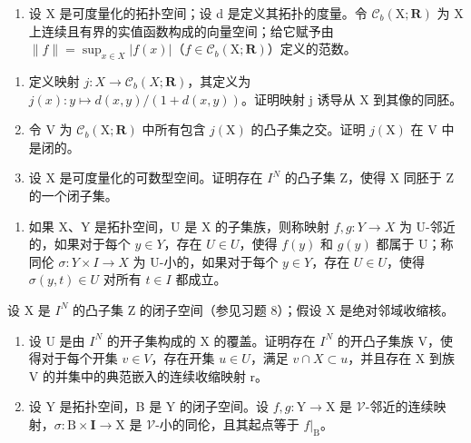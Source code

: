 \begin{enumerate}
\def\labelenumi{\arabic{enumi})}
\setcounter{enumi}{7}
\tightlist
\item
  设 X 是可度量化的拓扑空间；设 d 是定义其拓扑的度量。令 \(\mathcal{C}_{b}(\mathrm{X};\mathbf{R})\) 为 X 上连续且有界的实值函数构成的向量空间；给它赋予由 \(\|f\| = \sup_{x \in X} |f(x)|\)（\(f \in \mathcal{C}_{b}(\mathrm{X};\mathbf{R})\)）定义的范数。
\end{enumerate}

\begin{enumerate}
\def\labelenumi{\alph{enumi})}
\item
  定义映射 \(j\colon X \to \mathcal{C}_{b}(X; \mathbf{R})\)，其定义为 \(j(x)\colon y \mapsto d(x, y)/(1 + d(x, y))\)。证明映射 j 诱导从 X 到其像的同胚。
\item
  令 V 为 \(\mathcal{C}_{b}(\mathrm{X};\mathbf{R})\) 中所有包含 \(j(\mathrm{X})\) 的凸子集之交。证明 \(j(\mathrm{X})\) 在 V 中是闭的。
\item
  设 X 是可度量化的可数型空间。证明存在 \(I^{N}\) 的凸子集 Z，使得 X 同胚于 Z 的一个闭子集。
\end{enumerate}

\begin{enumerate}
\def\labelenumi{\arabic{enumi})}
\setcounter{enumi}{8}
\tightlist
\item
  如果 X、Y 是拓扑空间，U 是 X 的子集族，则称映射 \(f, g: Y \to X\) 为 U-邻近的，如果对于每个 \(y \in Y\)，存在 \(U \in U\)，使得 \(f(y)\) 和 \(g(y)\) 都属于 U；称同伦 \(\sigma: Y \times I \to X\) 为 U-小的，如果对于每个 \(y \in Y\)，存在 \(U \in U\)，使得 \(\sigma(y, t) \in U\) 对所有 \(t \in I\) 都成立。
\end{enumerate}

设 X 是 \(I^{N}\) 的凸子集 Z 的闭子空间（参见习题 8）；假设 X 是绝对邻域收缩核。

\begin{enumerate}
\def\labelenumi{\alph{enumi})}
\item
  设 U 是由 \(I^{N}\) 的开子集构成的 X 的覆盖。证明存在 \(I^{N}\) 的开凸子集族 V，使得对于每个开集 \(v \in V\)，存在开集 \(u \in U\)，满足 \(v \cap X \subset u\)，并且存在 X 到族 V 的并集中的典范嵌入的连续收缩映射 r。
\item
  设 Y 是拓扑空间，B 是 Y 的闭子空间。设 \(f, g: \mathrm{Y} \to \mathrm{X}\) 是 \(\mathcal{V}\)-邻近的连续映射，\(\sigma: \mathrm{B} \times \mathbf{I} \to \mathrm{X}\) 是 \(\mathcal{V}\)-小的同伦，且其起点等于 \(f|_{\mathrm{B}}\)。
\end{enumerate}

